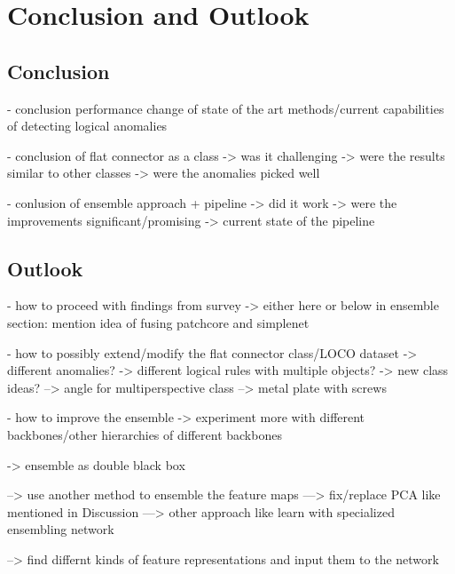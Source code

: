\chapter{Conclusion and Outlook}
\label{chap:conclusion}


\section{Conclusion}
\label{sec:realconclusion}

- conclusion performance change of state of the art methods/current capabilities of detecting logical anomalies

- conclusion of flat connector as a class
-> was it challenging
-> were the results similar to other classes
-> were the anomalies picked well%

- conlusion of ensemble approach + pipeline
-> did it work
-> were the improvements significant/promising
-> current state of the pipeline




\section{Outlook}
\label{sec:finaloutlook}

- how to proceed with findings from survey
-> either here or below in ensemble section: mention idea of fusing patchcore and simplenet

- how to possibly extend/modify the flat connector class/LOCO dataset
-> different anomalies?
-> different logical rules with multiple objects?
-> new class ideas?
--> angle for multiperspective class
--> metal plate with screws

- how to improve the ensemble
-> experiment more with different backbones/other hierarchies of different backbones

-> ensemble as double black box

--> use another method to ensemble the feature maps
---> fix/replace PCA like mentioned in Discussion
---> other approach like learn with specialized ensembling network

--> find differnt kinds of feature representations and input them to the network

